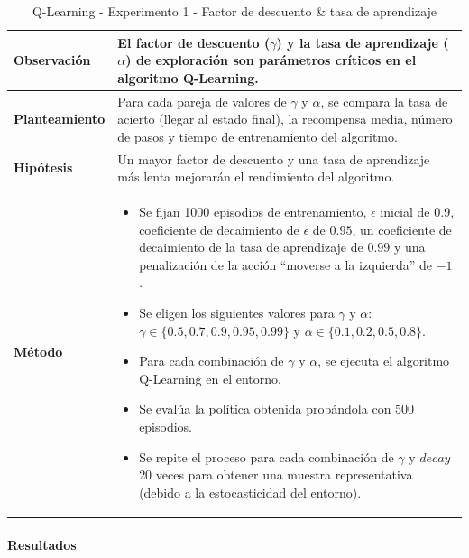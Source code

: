 \begin{table}[H]
    \centering
    \begin{tabularx}{\textwidth}{|p{4cm}|X|} %
        \hline %
        \textbf{Observación} & El factor de descuento ($\gamma$) y la tasa de aprendizaje ($\alpha$) de exploración son parámetros críticos en el algoritmo Q-Learning. 
        \\ \hline 
        \textbf{Planteamiento} & Para cada pareja de valores de $\gamma$ y $\alpha$, se compara la tasa de acierto (llegar al estado final), la recompensa media, número de pasos y tiempo de entrenamiento del algoritmo.
        \\ \hline 
        \textbf{Hipótesis} & Un mayor factor de descuento y una tasa de aprendizaje más lenta mejorarán el rendimiento del algoritmo.
        \\ \hline 
        \textbf{Método} & 
        \begin{itemize}
            \item Se fijan 1000 episodios de entrenamiento, \(\epsilon\) inicial de $0.9$, coeficiente de decaimiento de \(\epsilon\) de $0.95$, un coeficiente de decaimiento de la tasa de aprendizaje de $0.99$ y una penalización de la acción ``moverse a la izquierda'' de $-1$.
            \item Se eligen los siguientes valores para \(\gamma\) y $\alpha$: \(\gamma \in \{0.5, 0.7, 0.9, 0.95, 0.99\}\) y $\alpha \in \{0.1, 0.2, 0.5, 0.8\}$.
            \item Para cada combinación de \(\gamma\) y $\alpha$, se ejecuta el algoritmo Q-Learning en el entorno.
            \item Se evalúa la política obtenida probándola con 500 episodios.
            \item Se repite el proceso para cada combinación de \(\gamma\) y $decay$ 20 veces para obtener una muestra representativa (debido a la estocasticidad del entorno).
        \end{itemize}
        \\ \hline
    \end{tabularx}
    \caption{Q-Learning - Experimento 1 - Factor de descuento \& tasa de aprendizaje}
    \label{tab:diseñoQLEarningExp1}
\end{table}

\paragraph{Resultados}

